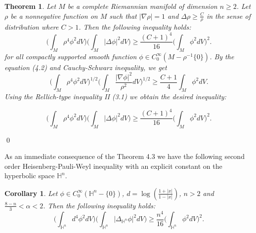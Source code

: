 \documentclass[12pt]{amsart}
\numberwithin{equation}{section}
\newtheorem{theorem}{Theorem}
\numberwithin{theorem}{section}
\numberwithin{theorem}{section} \numberwithin{lemma}{section}
\numberwithin{definition}{section}
\newtheorem{corollary}{Corollary}
\numberwithin{corollary}{section}
\numberwithin{remark}{section}
\numberwithin{proposition}{section}
\begin{document}
\begin{theorem} Let $M$ be a complete  Riemannian manifold of dimension $n\ge2$. Let $\rho$ be a nonnegative function on $M$ such that
$|\nabla \rho|=1$ and $\Delta\rho\ge \frac{C}{\rho}$ in the sense of
distribution where $C>1$. Then the following inequality holds:
\begin{equation}
\Big(\int_M \rho^4\phi^2dV\Big)\Big(\int_M|\Delta
\phi|^2dV\Big)\ge\frac{(C+1)^4}{16} \Big(\int_M\phi^2 dV\Big)^2.
\end{equation} for all compactly supported smooth function $\phi\in
C_0^{\infty}(M-\rho^{-1}\{0\})$.
 \proof By the equation (4.2) and Cauchy-Schwarz
inequality, we get
\[\Big(\int_M\rho^4\phi^2dV\Big)^{1/2}\Big(\int_M
\frac{|\nabla\phi|^2}{\rho^2}dV\Big)^{1/2}\ge \frac{C+1}{4}
\int_M\phi^2dV.\] Using the  \textit{Rellich-type inequality II}
(3.1) we obtain the desired inequality:

\[\Big(\int_M\rho^4\phi^2dV\Big)\Big(\int_M|\Delta
\phi|^2dV\Big)\ge\frac{(C+1)^4}{16} \Big(\int_M\phi^2 dV\Big)^2.\]
\end{theorem}
\qed

As an immediate consequence of the Theorem 4.3 we have the following
second order Heisenberg-Pauli-Weyl inequality with an explicit
constant on the hyperbolic space $\mathbb{H}^n$.
\begin{corollary}  Let
$\phi\in C_0^{\infty}(\mathbb{H}^n-\{0\})$,
$d=\log(\frac{1+|x|}{1-|x|})$, $n> 2$ and $\frac{8-n}{3}<\alpha<2$.
Then the following inequality holds:
\begin{equation}
\Big(\int_{\mathbb{H}^n}
d^4\phi^2dV\Big)\Big(\int_{\mathbb{H}^n}|\Delta_{\mathbb{H}^n}
\phi|^2dV\Big)\ge\frac{n^4}{16} \Big(\int_{\mathbb{H}^n}\phi^2
dV\Big)^2.
\end{equation}
\end{corollary}
\end{document}
